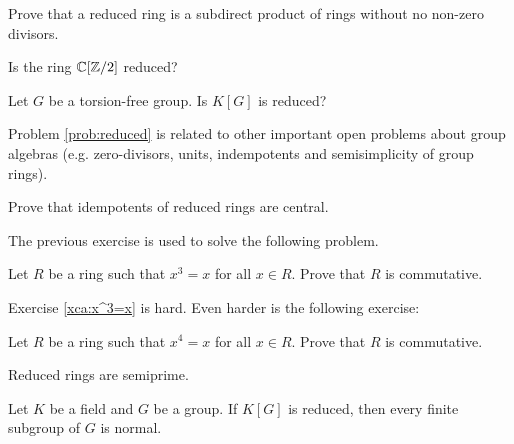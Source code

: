 \begin{exercise}
    Prove that a reduced ring is a subdirect product
    of rings without no non-zero divisors. 
\end{exercise}

\begin{exercise}
    Is the ring $\mathbb{C}[\mathbb{Z}/2]$ reduced? 
\end{exercise}


\begin{problem}
\label{prob:reduced}
    Let $G$ be a torsion-free group. Is
    $K[G]$ is reduced?
\end{problem}

Problem \ref{prob:reduced} is related to other important
open problems about group algebras 
(e.g. zero-divisors, units, 
indempotents and semisimplicity of group
rings).

\begin{exercise}
\label{xca:reduced_central}
    Prove that idempotents of reduced rings are central. 
\end{exercise}

The previous exercise is used to solve the following problem.

\begin{exercise}
\label{xca:x^3=x}
    Let $R$ be a ring such that $x^3=x$ for all $x\in R$. Prove that
    $R$ is commutative. 
\end{exercise}

Exercise \ref{xca:x^3=x} is hard. 
Even harder is the following exercise:

\begin{exercise}
\label{xca:x^4=x}
    Let $R$ be a ring such that $x^4=x$ for all $x\in R$. Prove
    that $R$ is commutative. 
\end{exercise}



\begin{exercise}
\label{xca:reduced=>semiprime}
    Reduced rings are semiprime.
\end{exercise}
 
\begin{theorem}
\label{thm:reduced}
    Let $K$ be a field and $G$ be a group. If $K[G]$
    is reduced, then every finite subgroup of $G$ is normal. 
\end{theorem}

